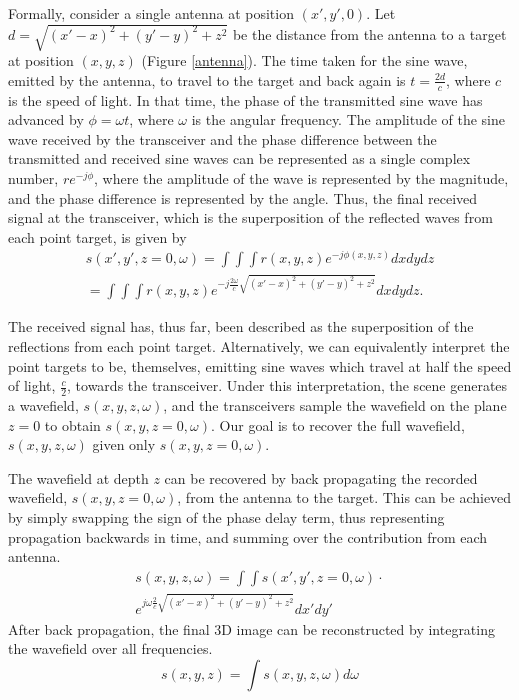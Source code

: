 \documentclass[twocolumn]{article}
\begin{document}
Formally, consider a single antenna at position $(x', y', 0)$. Let $d = \sqrt{(x'-x)^2+(y'-y)^2+z^2}$ be the distance from the antenna to a target at position $(x,y,z)$ (Figure \ref{antenna}). The time taken for the sine wave, emitted by the antenna, to travel to the target and back again is $t = \frac{2d}{c}$, where $c$ is the speed of light. In that time, the phase of the transmitted sine wave has advanced by $\phi = \omega t$, where $\omega$ is the angular frequency. The amplitude of the sine wave received by the transceiver and the phase difference between the transmitted and received sine waves can be represented as a single complex number, $r e^{-j \phi}$, where the amplitude of the wave is represented by the magnitude, and the phase difference is represented by the angle. Thus, the final received signal at the transceiver, which is the superposition of the reflected waves from each point target, is given by
%
\begin{gather}
s(x', y', z=0, \omega) = \int \int \int r(x,y,z) e^{-j \phi(x,y,z)} dx dy dz \nonumber \\
= \int \int \int r(x,y,z) e^{-j \frac{2\omega}{c} \sqrt{(x'-x)^2 + (y'-y)^2 + z^2}} dx dy dz.
\end{gather}

The received signal has, thus far, been described as the superposition of the reflections from each point target. Alternatively, we can equivalently interpret the point targets to be, themselves, emitting sine waves which travel at half the speed of light, $\frac{c}{2}$, towards the transceiver. Under this interpretation, the scene generates a wavefield, $s(x,y,z,\omega)$, and the transceivers sample the wavefield on the plane $z=0$ to obtain $s(x,y,z=0,\omega)$. Our goal is to recover the full wavefield, $s(x,y,z,\omega)$ given only $s(x,y,z=0,\omega)$.

The wavefield at depth $z$ can be recovered by back propagating the recorded wavefield, $s(x, y, z=0, \omega)$, from the antenna to the target. This can be achieved by simply swapping the sign of the phase delay term, thus representing propagation backwards in time, and summing over the contribution from each antenna.
%
\begin{gather}
s(x,y,z,\omega) =\int\int s(x',y',z=0,\omega) \cdot \nonumber \\
e^{j \omega \frac{2}{c} \sqrt{(x'-x)^{2}+(y'-y)^{2}+z^{2}}} dx'dy'
\end{gather}
%
After back propagation, the final 3D image can be reconstructed by integrating the wavefield over all frequencies.
\begin{equation}
s(x,y,z)=\int s(x,y,z,\omega) d\omega
\end{equation}
\end{document}
